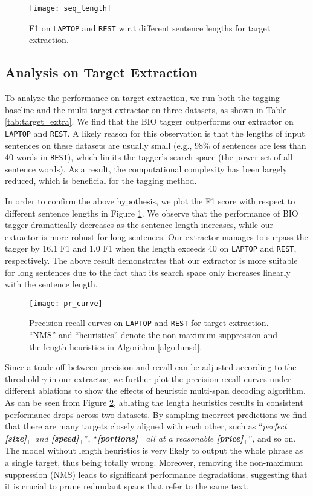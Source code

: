 \documentclass[11pt,a4paper]{article}
\begin{document}
\begin{figure}
\center
\texttt{[image: seq\_length]}
\caption{F1 on \texttt{LAPTOP} and \texttt{REST} w.r.t different sentence lengths for target extraction.}
\label{fig:seq_len}
\end{figure}


\subsection{Analysis on Target Extraction}
To analyze the performance on target extraction, we run both the tagging baseline and the multi-target extractor on three datasets, as shown in Table \ref{tab:target_extra}.
We find that the BIO tagger outperforms our extractor on \texttt{LAPTOP} and \texttt{REST}.
A likely reason for this observation is that the lengths of input sentences on these datasets are usually small (e.g., 98\% of sentences are less than 40 words in \texttt{REST}), which limits the tagger's search space (the power set of all sentence words).
As a result, the computational complexity has been largely reduced, which is beneficial for the tagging method.

In order to confirm the above hypothesis, we plot the F1 score with respect to different sentence lengths in Figure \ref{fig:seq_len}. 
We observe that the performance of BIO tagger dramatically decreases as the sentence length increases, while our extractor is more robust for long sentences.
Our extractor manages to surpass the tagger by 16.1 F1 and 1.0 F1 when the length exceeds 40 on \texttt{LAPTOP} and \texttt{REST}, respectively.
The above result demonstrates that our extractor is more suitable for long sentences due to the fact that its search space only increases linearly with the sentence length.


\begin{figure}
\center
\texttt{[image: pr\_curve]}
\caption{Precision-recall curves on \texttt{LAPTOP} and \texttt{REST} for target extraction.  ``NMS'' and ``heuristics'' denote the non-maximum suppression and the length heuristics in Algorithm \ref{algo:hmsd}.}
\label{fig:pr_curve}
\end{figure}

Since a trade-off between precision and recall can be adjusted according to the threshold $\gamma$ in our extractor, we further plot the precision-recall curves under different ablations to show the effects of heuristic multi-span decoding algorithm.
As can be seen from Figure \ref{fig:pr_curve}, ablating the length heuristics results in consistent performance drops across two datasets.
By sampling incorrect predictions we find that there are many targets closely aligned with each other, such as ``\emph{perfect \textbf{[size]}$_{\text{+}}$ and \textbf{[speed]}$_{\text{+}}$}'', ``\emph{\textbf{[portions]}$_{\text{+}}$ all at a reasonable \textbf{[price]}$_{\text{+}}$}'', and so on.
The model without length heuristics is very likely to output the whole phrase as a single target, thus being totally wrong.
Moreover, removing the non-maximum suppression (NMS) leads to significant performance degradations, suggesting that it is crucial to prune redundant spans that refer to the same text.
\end{document}
